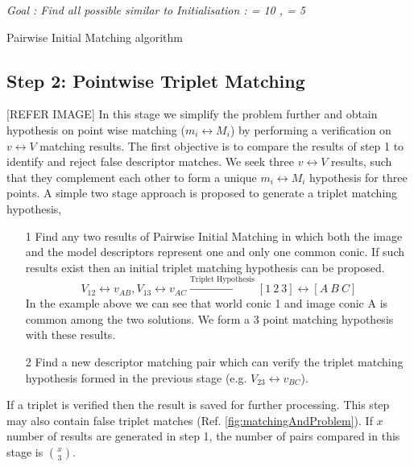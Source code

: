 \documentclass{bmvc2k}
\begin{document}
\begin{algorithm}
\emph{Goal : Find all possible \threeDFv similar to \twoDFv} \;
\emph{Initialisation : \ThresholdD = 10 , \ThresholdA = 5} \; 
\caption{Pairwise Initial Matching algorithm}
\end{algorithm}

\subsection{Step 2: Pointwise Triplet Matching}
[REFER IMAGE]
In this stage we simplify the problem further and obtain hypothesis on point wise matching ($ m_i \leftrightarrow M_i $) by performing a verification on $ v \leftrightarrow V $ matching results. 
The first objective is to compare the results of step 1 to identify and reject false descriptor matches. 
We seek three $ v \leftrightarrow V $ results, such that they complement each other to form a unique $ m_i \leftrightarrow M_i $ hypothesis for three points. 
A simple two stage approach is proposed to generate a triplet matching hypothesis,
\begin{enumerate}
\item[1] Find any two results of Pairwise Initial Matching in which both the image and the model descriptors represent one and only one common conic. If such results exist then an initial triplet matching hypothesis can be proposed. 
\[
 V_{12} \leftrightarrow v_{AB},V_{13} \leftrightarrow v_{AC } \xrightarrow{\text{Triplet Hypothesis}} [1~2~3] \leftrightarrow [A~B~ C]
\]
In the example above we can see that world conic 1 and image conic A is common among the two solutions. We form a 3 point matching hypothesis with these results. 
\item[2] Find a new descriptor matching pair which can verify the triplet matching hypothesis formed in the previous stage (e.g. $ V_{23} \leftrightarrow v_{BC}$).
\end{enumerate}
If a triplet is verified then the result is saved for further processing. This step may also contain false triplet matches (Ref. \ref{fig:matchingAndProblem}). If $ x $ number of results are generated in step 1, the number of pairs compared in this stage is $ \binom{x}{3} $. 
\end{document}
